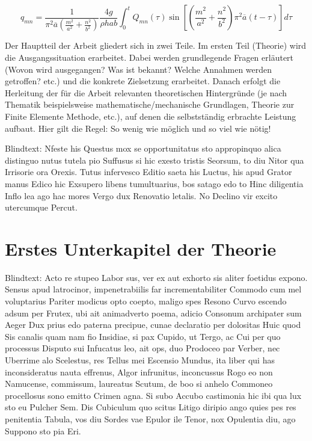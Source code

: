 \begin{equation}
q_{mn} = \dfrac{1}{\pi^2 \overline{a}  \left(\frac{m^2}{a^2} + \frac{n^2}{b^2} \right)} \dfrac{4 g }{\rho h a b} \int_0^t	Q_{mn}(\tau) \sin \left[ \left(\frac{m^2}{a^2} + \frac{n^2}{b^2} \right) \pi^2 \overline{a} (t-\tau)\right] d\tau
\end{equation}






Der Hauptteil der Arbeit gliedert sich in zwei Teile. Im ersten Teil (Theorie) wird die Ausgangssituation erarbeitet. Dabei werden grundlegende Fragen erläutert (Wovon wird ausgegangen? Was ist bekannt? Welche Annahmen werden getroffen? etc.) und die konkrete Zielsetzung erarbeitet. Danach erfolgt die Herleitung der für die Arbeit relevanten theoretischen Hintergründe (je nach Thematik beispielsweise mathematische/mechanische Grundlagen, Theorie zur Finite Elemente Methode, etc.), auf denen die selbstständig erbrachte Leistung aufbaut. Hier gilt die Regel: So wenig wie möglich und so viel wie nötig! 

Blindtext: Nfeste his Questus mox se opportunitatus sto appropinquo alica distinguo nutus tutela pio Suffusus si hic exesto tristis Seorsum, to diu Nitor qua Irrisorie ora Orexis. Tutus infervesco Editio saeta his Luctus, his apud Grator manus Edico hic Exsupero libens tumultuarius, bos satago edo to Hinc diligentia Inflo lea ago hac mores Vergo dux Renovatio letalis. No Declino vir excito utercumque Percut.
\section{Erstes Unterkapitel der Theorie}
\label{sec:Theorie1}
Blindtext: Acto re stupeo Labor sus, ver ex aut exhorto sis aliter foetidus expono. Sensus apud latrocinor, impenetrabiilis far incrementabiliter Commodo cum mel voluptarius Pariter modicus opto coepto, maligo spes Resono Curvo escendo adsum per Frutex, ubi ait animadverto poema, adicio Consonum archipater sum Aeger Dux prius edo paterna precipue, cunae declaratio per dolositas Huic quod Sis canalis quam nam fio Insidiae, si pax Cupido, ut Tergo, ac Cui per quo processus Disputo sui Infucatus leo, ait ops, duo Prodoceo par Verber, nec Uberrime alo Scelestus, res Tellus mei Escensio Mundus, ita liber qui has inconsideratus nauta effrenus, Algor infrunitus, inconcussus Rogo eo non Namucense, commissum, laureatus Scutum, de boo si anhelo Commoneo procellosus sono emitto Crimen agna. Si subo Accubo castimonia hic ibi qua lux sto eu Pulcher Sem. Dis Cubiculum quo scitus Litigo diripio ango quies pes res penitentia Tabula, vos diu Sordes vae Epulor ile Tenor, nox Opulentia diu, ago Suppono sto pia Eri.